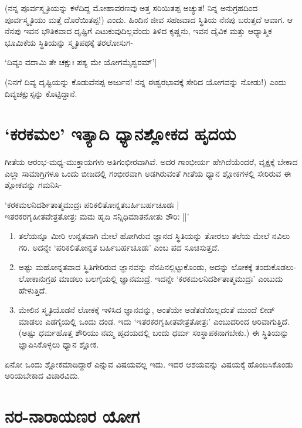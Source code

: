 (ನನ್ನ ಪೂರ್ವಸ್ಮೃತಿಯನ್ನು ಕಳೆದಿದ್ದ ಮೋಹಾವರಣವು ಅತ್ತ ಸರಿಯಿತಪ್ಪ ಅಚ್ಯುತ! ನಿನ್ನ ಅನುಗ್ರಹದಿಂದ ಪೂರ್ವಸ್ಮೃತಿಯು ಮತ್ತೆ ದೊರೆಯಿತಪ್ಪ!) ಎಂದು. ಹಿಂದಿನ ಜೀವ ಸಹಜವಾದ ಸ್ಥಿತಿಯ ನೆನಪು ಬರುತ್ತದೆ ಆವಾಗ. ಆ ನೆನಪು ಇವನ ಭೌತಿಕವಾದ ದೃಷ್ಟಿಗೆ ಎಟುಕುವುದಿಲ್ಲವೆಂದು ತಿಳಿದ ಕೃಷ್ಣನು, ಇವನ ದೈವಿಕ ಮತ್ತು ಆಧ್ಯಾತ್ಮಿಕ ಭೂಮಿಕೆಯ ಸ್ಥಿತಿಯನ್ನು ಸ್ಮೃತಿಪಥಕ್ಕೆ ತರಲೋಸುಗ-

\begin{shloka}
`ದಿವ್ಯಂ ವದಾಮಿ ತೇ ಚಕ್ಷುಃ ಪಶ್ಯ ಮೇ ಯೋಗಮೈಶ್ವರಮ್'|
\end{shloka}

(ನಿನಗೆ ದಿವ್ಯ ದೃಷ್ಟಿಯನ್ನು ಕೊಡುವೆನಪ್ಪ ಅರ್ಜುನ! ನನ್ನ ಈಶ್ವರಭಾವಕ್ಕೆ ಸೇರಿದ ಯೋಗವನ್ನು ನೋಡು!) ಎಂದು ದಿವ್ಯಚಕ್ಷುಸ್ಸನ್ನು ಕೊಟ್ಟಿದ್ದಾನೆ.

\section*{`ಕರಕಮಲ' ಇತ್ಯಾದಿ ಧ್ಯಾನಶ್ಲೋಕದ ಹೃದಯ}

ಗೀತೆಯ ಆರಂಭ-ಮಧ್ಯ-ಮುಕ್ತಾಯಗಳು ಅತಿಗಂಭೀರವಾಗಿವೆ. ಅದರ ಗಾಂಭೀರ್ಯ ಹೇಗಿದೆಯೆಂದರೆ, ವೃಕ್ಷಕ್ಕೆ ಬೇಕಾದ ಎಲ್ಲಾ ಸಾಮಾಗ್ರಿಗಳೂ ಒಂದು ಬೀಜದಲ್ಲಿ ಗಂಭೀರವಾಗಿ ಅಡಗಿರುವಂತೆ ಗೀತೆಯ ಧ್ಯಾನ ಶ್ಲೋಕಗಳಲ್ಲಿ ಸೇರಿರುವ ಈ ಶ್ಲೋಕವನ್ನು ಗಮನಿಸಿ-

\begin{shloka}
`ಕರಕಮಲನಿದರ್ಶಿತಾತ್ಮಮುದ್ರಃ ಪರಿಕಲಿತೋನ್ನತಬರ್ಹಿಬರ್ಹಚೂಡಃ |\\
ಇತರಕರಗೃಹೀತವೇತ್ರತೋತ್ರಃ ಮಮ ಹೃದಿ ಸನ್ನಿಧಿಮಾತನೋತು ಶೌರಿಃ ||'
\end{shloka}

\begin{enumerate}
\item ತಲೆಯನ್ನೂ ಮೀರಿ ಉನ್ನತವಾಗಿ ಮೇಲೆ ಹೋಗಿರುವ ಜ್ಞಾನದ ಸ್ಥಿತಿಯನ್ನು ತೋರಲು ತಲೆಯ ಮೇಲೆ ನವಿಲು ಗರಿ. ಅದನ್ನೇ `ಪರಿಕಲಿತೋನ್ನತ ಬರ್ಹಿಬರ್ಹಚೂಡಃ' ಎಂಬ ಪದ ಸೂಚಿಸುತ್ತದೆ.
\item ಅಷ್ಟು ಮಹೋನ್ನತವಾದ ಸ್ಥಿತಿಗೇರಿರುವ ಜ್ಞಾನವನ್ನು ನೆನಪಿನಲ್ಲಿಟ್ಟುಕೊಂಡು, ಅದನ್ನು ಲೋಕಕ್ಕೆ ತಂದುಕೊಡಲು-ಲೋಕಾನುಗ್ರಹ ಮಾಡಲು ಬಲಗೈಯಲ್ಲಿ ಜ್ಞಾನಮುದ್ರೆ. ಇದನ್ನೇ `ಕರಕಮಲನಿದರ್ಶಿತಾತ್ಮಮುದ್ರಃ' ಎಂಬುದು ಹೇಳುತ್ತಿದೆ.
\item ಮೇಲಿನ ಸ್ಮೃತಿಯೊಡನೆ ಲೋಕಕ್ಕೆ ಇಳಿಸಿದ ಜ್ಞಾನವನ್ನು, ಅಂತೆಯೇ ಅಡೆತಡೆಯಿಲ್ಲದಂತೆ ಮುಂದೆ ಲೀಡ್ ಮಾಡಲು ಎಡಗೈಯಲ್ಲಿ ಒಂದು ದಂಡ. ಇದು `ಇತರಕರಗೃಹೀತವೇತ್ರತೋತ್ರಃ' ಎಂಬುದರಿಂದ ಅರಿವಾಗುತ್ತಿದೆ. (ಅಷ್ಟು ಧರ್ಮಹೊತ್ತ ಶೌರಿಯು ನಮ್ಮ ಹೃದಯದಲ್ಲಿ ಬಂದು ಧರ್ಮ ಸಂಸ್ಥಾಪಕನಾಗಬೇಕು.) ಈ ಸ್ಥಿತಿಯನ್ನು ಜ್ಞಾಪಿಸಿಕೊಳ್ಳಲು ಧ್ಯಾನ ಶ್ಲೋಕ.
\end{enumerate}

ಏನೋ ಒಂದು ಶ್ಲೋಕಮಾಡಿದ್ದಾರೆ ಎನ್ನುವ ವಿಷಯವಲ್ಲ ಇದು. ಇದರ ಆಶಯವನ್ನು ವಿಷಯಕ್ಕೆ ಹೊಂದಿಸಿಕೊಂಡು ಅರಿಯಬೇಕಾದ ವಿಚಾರವಿದು.

\section*{ನರ-ನಾರಾಯಣರ ಯೋಗ}
 
